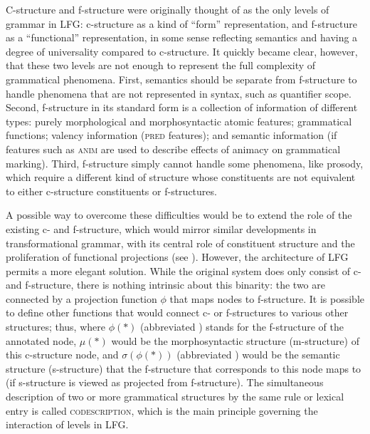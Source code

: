 \documentclass[output=paper]{langscibook}
\begin{document}
 C-structure and f-structure were originally thought of as the only levels of grammar in LFG: c-structure as a kind of ``form'' representation, and f-structure as a ``functional'' representation, in some sense reflecting semantics and having a degree of universality compared to c-structure. It quickly became clear, however, that these two levels are not enough to represent the full complexity of grammatical phenomena. First, semantics should be separate from f-structure to handle phenomena that are not represented in syntax, such as quantifier scope. Second, f-structure in its standard form is a collection of information of different types: purely morphological and morphosyntactic atomic features; grammatical functions; valency information (\textsc{pred} features); and semantic information (if features such as \textsc{anim} are used to describe effects of animacy on grammatical marking). Third, f-structure simply cannot handle some phenomena, like prosody, which require a different kind of structure whose constituents are not equivalent to either c-structure constituents or f-structures.
 
 A possible way to overcome these difficulties would be to extend the role of the existing c- and f-structure, which would mirror similar developments in transformational grammar, with its central role of constituent structure and the proliferation of functional projections (see ).  However, the architecture of LFG permits a more elegant solution. While the original system does only consist of c- and f-structure, there is nothing intrinsic about this binarity: the two are connected by a projection function $\phi$ that maps nodes to f-structure. It is possible to define other functions that would connect c- or f-structures to various other structures; thus, where $\phi(\ast)$ (abbreviated \DOWN) stands for the f-structure of the annotated node, $\mu(\ast)$ would be the morphosyntactic structure (m-structure) of this c-structure node, and $\sigma(\phi(\ast))$ (abbreviated \UPS) would be the semantic structure (s-structure) that the f-structure that corresponds to this node maps to (if s-structure is viewed as projected from f-structure). The simultaneous description of two or more grammatical structures by the same rule or lexical entry is called \textsc{codescription}, which is the main principle governing the interaction of levels in LFG.
 
\end{document}
